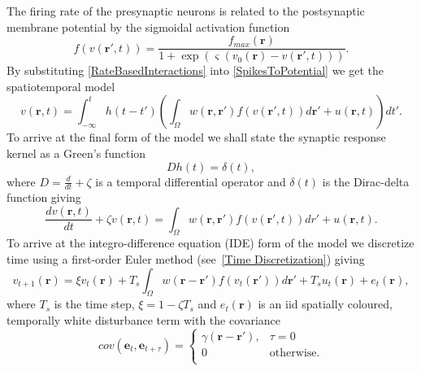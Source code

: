 \documentclass[12pt]{iopart}		%
\begin{document}
The firing rate of the presynaptic neurons is related to the postsynaptic membrane potential by the sigmoidal activation function
\begin{equation}\label{ActivationFunction}
	f\left( v\left( \mathbf{r}', t \right) \right) = \frac{f_{max}\left(\mathbf{r}\right)}{1 + \exp \left( \varsigma \left( v_0\left( \mathbf{r} \right) - v\left(\mathbf{r}',t\right) \right) \right)}.
\end{equation}
By substituting \ref{RateBasedInteractions} into \ref{SpikesToPotential}  we get the spatiotemporal model
\begin{equation}\label{FullDoubleIntModel}
	v\left(\mathbf{r},t\right) = \int_{-\infty}^t h\left(t - t'\right) \left(\int_\Omega   w\left(\mathbf{r},\mathbf{r}'\right) f\left( v\left( \mathbf{r}',t \right)\right)d\mathbf{r}' + u(\mathbf{r},t) \right)dt'.
\end{equation}
To arrive at the final form of the model we shall state the synaptic response kernel as a Green's function
\begin{equation}\label{GreensFuncDef}
	Dh\left( t \right) = \delta \left( t \right),
\end{equation}
where $D=\frac{d}{dt} + \zeta$ is a temporal differential operator and $\delta(t)$ is the Dirac-delta function giving 
\begin{equation}\label{FinalFormContinuous}
	\frac{dv\left( \mathbf{r},t \right)}{dt} + \zeta v\left( \mathbf{r},t \right) = \int_\Omega  {w\left( \mathbf{r},\mathbf{r}' \right)f\left( {v\left( \mathbf{r}',t \right)} \right)dr'} + u\left(\mathbf{r},t\right).
\end{equation}
To arrive at the integro-difference equation (IDE) form of the model we discretize time using a first-order Euler method (see~\ref{Time Discretization}) giving
\begin{equation}\label{DiscreteTimeModel}
	v_{t+1}\left(\mathbf{r}\right) = \xi v_t\left(\mathbf{r}\right) + T_s \int_\Omega { w\left(\mathbf{r}-\mathbf{r}'\right) f\left(v_t\left(\mathbf{r}'\right)\right) d\mathbf{r}'} + T_s u_t\left(\mathbf{r}\right) + e_t\left(\mathbf{r}\right),
\end{equation} 
where $T_s$ is the time step, $\xi = 1-\zeta T_s$ and $e_t\left(\mathbf{r}\right)$ is an iid spatially coloured, temporally white disturbance term with the covariance 
\begin{equation}
    cov(\mathbf{e}_t,\mathbf{e}_{t+\tau}) = \left\{ \begin{array}{*{20}{c}}
    \gamma\left(\mathbf{r}-\mathbf{r'}\right), & \tau=0 \\
    0 & \mathrm{otherwise}. \\
    \end{array} \right.
\end{equation}
\end{document}
